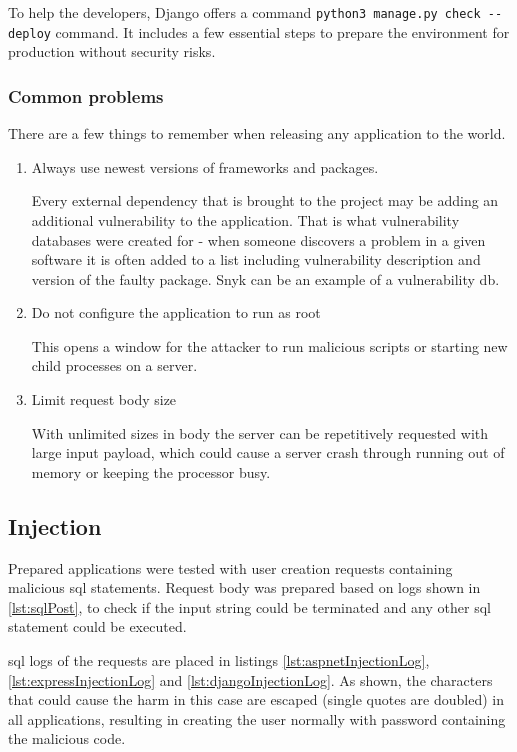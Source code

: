 To help the developers, Django offers a command \lstinline{python3 manage.py check --deploy} command. It includes a few essential steps to prepare the environment for production without security risks.


\subsubsection{Common problems}
There are a few things to remember when releasing any application to the world.
\begin{enumerate}
      \item Always use newest versions of frameworks and packages.

            Every external dependency that is brought to the project may be adding an additional vulnerability to the application. That is what vulnerability databases were created for - when someone discovers a problem in a given software it is often added to a list including vulnerability description and version of the faulty package. Snyk can be an example of a vulnerability \acrshort{db}. \cite{snyk}

      \item Do not configure the application to run as root

            This opens a window for the attacker to run malicious scripts or starting new child processes on a server.

      \item Limit request body size

            With unlimited sizes in body the server can be repetitively requested with large input payload, which could cause a server crash through running out of memory or keeping the processor busy. \cite{securityMisconfiguration}
\end{enumerate}

\subsection{Injection}
Prepared applications were tested with user creation requests containing malicious \acrshort{sql} statements. Request body was prepared based on logs shown in \ref{lst:sqlPost}, to check if the input string could be terminated and any other \acrshort{sql} statement could be executed.


\acrshort{sql} logs of the requests are placed in listings \ref{lst:aspnetInjectionLog}, \ref{lst:expressInjectionLog} and \ref{lst:djangoInjectionLog}. As shown, the characters that could cause the harm in this case are escaped (single quotes are doubled) in all applications, resulting in creating the user normally with password containing the malicious code.




